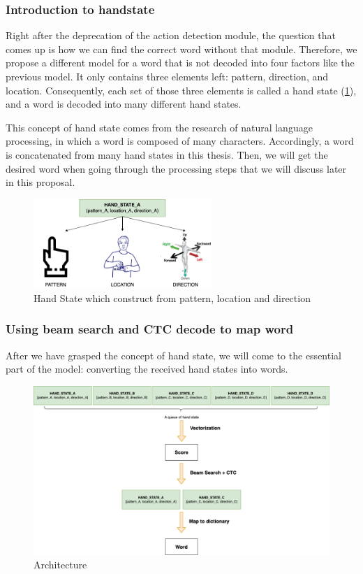 \subsubsection{ Introduction to handstate }\label{sec:handstate}

Right after the deprecation of the action detection module, the question that comes up is how we can find the correct word without that module. Therefore, we propose a different model for a word that is not decoded into four factors like the previous model. It only contains three elements left: pattern, direction, and location. Consequently, each set of those three elements is called a hand state (\ref{fig:Chap4-HandState}), and a word is decoded into many different hand states.

This concept of hand state comes from the research of natural language processing, in which a word is composed of many characters. Accordingly, a word is concatenated from many hand states in this thesis. Then, we will get the desired word when going through the processing steps that we will discuss later in this proposal.

\begin{figure}[H]
  \centering
  \includegraphics[width=0.6\textwidth]{img/Chap4/HandState.png}
  \caption{ Hand State which construct from pattern, location and direction}
  \label{fig:Chap4-HandState}
\end{figure}

\subsubsection{ Using beam search and CTC decode to map word}

After we have grasped the concept of hand state, we will come to the essential part of the model: converting the received hand states into words.
      
\begin{figure}[H]
  \centering
  \includegraphics[width=\textwidth]{img/Chap4/Architechture.png}
  \caption{Architecture}
  \label{fig:Chap4-Architechture}
\end{figure}

